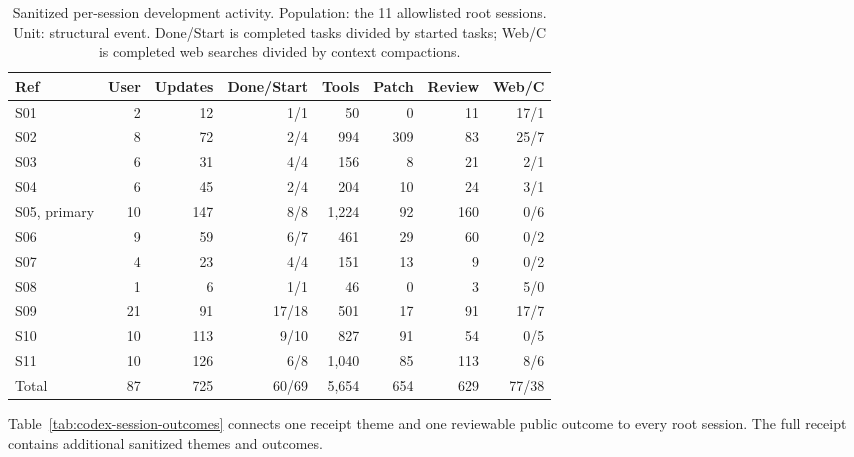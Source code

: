 \documentclass[11pt]{article}
\begin{document}
\begin{table}[H]
\centering
\scriptsize
\caption{Sanitized per-session development activity. Population: the 11 allowlisted root sessions. Unit: structural event. Done/Start is completed tasks divided by started tasks; Web/C is completed web searches divided by context compactions.}
\label{tab:codex-session-activity}
\begin{tabular*}{\textwidth}{@{\extracolsep{\fill}}lrrrrrrr}
\toprule
Ref & User & Updates & Done/Start & Tools & Patch & Review & Web/C \\
\midrule
S01 & 2 & 12 & 1/1 & 50 & 0 & 11 & 17/1 \\
S02 & 8 & 72 & 2/4 & 994 & 309 & 83 & 25/7 \\
S03 & 6 & 31 & 4/4 & 156 & 8 & 21 & 2/1 \\
S04 & 6 & 45 & 2/4 & 204 & 10 & 24 & 3/1 \\
S05, primary & 10 & 147 & 8/8 & 1,224 & 92 & 160 & 0/6 \\
S06 & 9 & 59 & 6/7 & 461 & 29 & 60 & 0/2 \\
S07 & 4 & 23 & 4/4 & 151 & 13 & 9 & 0/2 \\
S08 & 1 & 6 & 1/1 & 46 & 0 & 3 & 5/0 \\
S09 & 21 & 91 & 17/18 & 501 & 17 & 91 & 17/7 \\
S10 & 10 & 113 & 9/10 & 827 & 91 & 54 & 0/5 \\
S11 & 10 & 126 & 6/8 & 1,040 & 85 & 113 & 8/6 \\
\midrule
Total & 87 & 725 & 60/69 & 5,654 & 654 & 629 & 77/38 \\
\bottomrule
\end{tabular*}
\end{table}

Table~\ref{tab:codex-session-outcomes} connects one receipt theme and one reviewable public outcome to every root session. The full receipt contains additional sanitized themes and outcomes.
\end{document}
